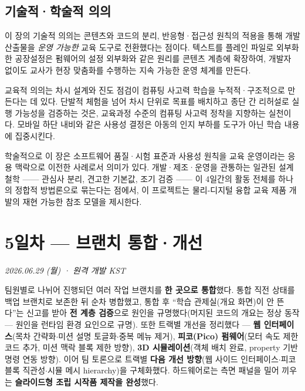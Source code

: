 \section{기술적·학술적 의의}

이 장의 기술적 의의는 콘텐츠와 코드의 분리, 반응형·접근성 원칙의 적용을 통해 개발 산출물을 \emph{운영 가능한} 교육 도구로 전환했다는 점이다. 텍스트를 플레인 파일로 외부화한 공장설정\cite{hunt1999pragmatic}은 펌웨어의 설정 외부화\cite{ares-repo}와 같은 원리를 콘텐츠 계층에 확장하여, 개발자 없이도 교사가 현장 맞춤화를 수행하는 지속 가능한 운영 체계를 만든다.

교육적 의의는 차시 설계와 진도 점검이 컴퓨팅 사고력 학습을 누적적·구조적으로 만든다는 데 있다. 단발적 체험을 넘어 차시 단위로 목표를 배치하고 종단 간 리허설로 실행 가능성을 검증하는 것은, 교육과정 수준의 컴퓨팅 사고력 정착\cite{grover2013ct, brennan2012ct}을 지향하는 실천이다. 모바일 하단 내비와 같은 사용성 결정\cite{marcotte2010responsive, wcag21, krug2014dontmakemethink}은 아동의 인지 부하를 도구가 아닌 학습 내용에 집중시킨다.

학술적으로 이 장은 소프트웨어 품질·시험 표준\cite{iso25010, iso29119}과 사용성 원칙\cite{nielsen1993usability, norman2013design}을 교육 운영이라는 응용 맥락으로 이전한 사례로서 의미가 있다. 개발·제조·운영을 관통하는 일관된 설계 철학 —— 관심사 분리, 견고한 기본값, 조기 검증 —— 이 4일간의 활동 전체를 하나의 정합적 방법론으로 묶는다는 점에서, 이 프로젝트는 물리-디지털 융합 교육 제품 개발의 재현 가능한 참조 모델을 제시한다.

\chapter{5일차 — 브랜치 통합·개선}
\textit{2026.06.29 (월) · 원격 개발 KST}

\begin{summarybox}
팀원별로 나뉘어 진행되던 여러 작업 브랜치를 \textbf{ 한 곳으로 통합}했다.
통합 직전 상태를 백업 브랜치로 보존한 뒤 순차 병합했고, 통합 후 ``학습 관제실(개요
화면)이 안 뜬다''는 신고를 받아 \textbf{전 계층 검증}으로 원인을 규명했다(머지된 코드의
개요는 정상 동작 --- 원인을 런타임 환경 요인으로 규명). 또한 트랙별 개선을 정리했다 ---
\textbf{웹 인터페이스}(목차 간략화$\cdot$미션 설명 토글화$\cdot$중복 메뉴 제거),
\textbf{피코(Pico) 펌웨어}(모터 속도 제한 코드 추가, 미션 맥락 블록 제한 방향),
\textbf{3D 시뮬레이션}(객체 배치 완료, property 기반 명령 연동 방향). 이어 팀 토론으로
트랙별 \textbf{다음 개선 방향}(웹 사이드 인터페이스$\cdot$피코 블록 직관성$\cdot$시뮬 메시
hierarchy)을 구체화했다. 하드웨어로는 측면 패널을 밀어 끼우는 \textbf{슬라이드형 조립
시작품 제작을 완성}했다.
\end{summarybox}

